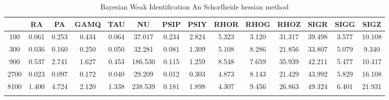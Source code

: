 \documentclass[a4paper,10pt]{article}
\begin{document}
\centering
\begin{longtable}{cccccccccccccc}
\toprule
 & RA & PA & GAMQ & TAU & NU & PSIP & PSIY & RHOR & RHOG & RHOZ & SIGR & SIGG & SIGZ \\
\midrule
100 & 0.061 & 0.253 & 0.434 & 0.064 & 37.017 & 0.234 & 2.824 & 5.323 & 3.120 & 31.317 & 39.498 & 3.577 & 10.108 \\
300 & 0.036 & 0.160 & 0.250 & 0.050 & 32.281 & 0.081 & 1.309 & 5.108 & 8.286 & 21.856 & 33.807 & 5.079 & 9.340 \\
900 & 0.537 & 2.741 & 1.627 & 0.453 & 186.530 & 0.115 & 1.259 & 8.548 & 7.659 & 35.939 & 42.211 & 5.477 & 10.417 \\
2700 & 0.023 & 0.097 & 0.172 & 0.040 & 29.209 & 0.012 & 0.303 & 4.873 & 8.143 & 21.429 & 43.992 & 5.829 & 16.108 \\
8100 & 1.400 & 4.724 & 2.120 & 1.338 & 238.539 & 0.181 & 1.898 & 4.307 & 9.456 & 26.863 & 49.324 & 6.401 & 21.931 \\
\bottomrule
\caption{Bayesian Weak Identification An Schorfheide hessian method}
\label{table:tbl:WeakAnScho_hessian}
\end{longtable}
\end{document}
